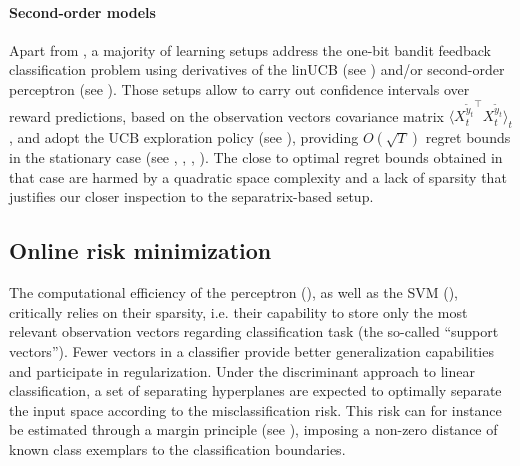 \documentclass[preprint,12pt,authoryear]{elsarticle}
\begin{document}
\paragraph{Second-order models} 
Apart from \cite{kakade2008efficient}, a majority of learning setups address the one-bit bandit feedback classification problem using derivatives of the linUCB  (see \cite{auer2002using}) and/or second-order perceptron (see \cite{cesa2005second}). Those setups allow to carry out confidence intervals over reward predictions, based on the observation vectors covariance matrix $\langle{X_t^{\tilde{y}_t}}^\top {X_t^{\tilde{y}_t}}\rangle_t$, and adopt the UCB exploration policy (see \cite{lai1985asymptotically}), providing $O(\sqrt{T})$ regret bounds in the stationary case (see \cite{li2010contextual}, \cite{hazan2011newtron}, \cite{crammer2013multiclass}, \cite{ngo2013upper}).
The close to optimal regret bounds obtained in that case are harmed by a quadratic space complexity and a lack of sparsity that justifies our closer inspection to the separatrix-based setup.




\subsection{Online risk minimization}

The computational efficiency of the perceptron (\cite{rosenblatt1958perceptron}), as well as the SVM (\cite{vapnik1998statistical}),  critically relies on their sparsity, i.e. their capability to store only the most relevant observation vectors regarding classification task (the so-called ``support vectors''). Fewer vectors in a classifier provide better generalization capabilities and participate in regularization.
Under the discriminant approach to linear classification, a set of separating hyperplanes are expected to optimally separate the input space according to the misclassification risk. This risk can for instance be estimated through a margin principle (see \cite{vapnik1998statistical}), imposing a non-zero distance of known class exemplars to the classification boundaries. 
\end{document}
